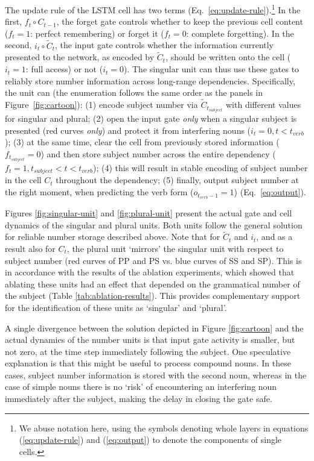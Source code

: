 The update rule of the LSTM cell has two terms
(Eq.~\ref{eq:update-rule}).\footnote{We abuse notation here, using the
  symbols denoting whole layers in equations (\ref{eq:update-rule}) and
  (\ref{eq:output}) to denote the components of single cells.} In the
first, $f_t \circ{} C_{t-1}$, the forget gate controls whether to keep
the previous cell content ($f_t=1$: perfect remembering) or forget it
($f_t=0$: complete forgetting). In the second,
$i_t\circ{} \tilde{C}_t$, the input gate controls whether the
information currently presented to the network, as encoded by
$\tilde{C}_t$, should be written onto the cell ($i_t=1$: full access)
or not ($i_t=0$). The singular unit can thus use these gates to
reliably store number information across long-range
dependencies. Specifically, the unit can (the enumeration follows the same order as the panels in Figure~\ref{fig:cartoon}): (1) encode subject
number via $\tilde{C}_{t_{subject}}$ with different values for
singular and plural; (2) open the input gate \textit{only} when a
singular subject is presented (red curves \textit{only}) and protect
it from interfering nouns ($i_t=0, t<t_{verb}$); (3) at the same time,
clear the cell from previously stored information
($f_{t_{subject}}=0$) and then store subject number across the entire
dependency ($f_t=1, t_{subject}<t<t_{verb}$); (4) this will result in
stable encoding of subject number in the cell $C_t$ throughout the
dependency; (5) finally, output subject number at the right moment,
when predicting the verb form ($o_{t_{verb}-1}=1$)
(Eq.~\ref{eq:output}).

Figures \ref{fig:singular-unit} and \ref{fig:plural-unit} present the actual gate and cell dynamics of the singular and plural units. Both units follow the general solution for reliable number storage described above. Note that for $\tilde{C}_t$ and $i_t$, and as a result also for $C_t$, the plural unit `mirrors' the singular unit with respect to subject number (red curves of PP and PS vs. blue curves of SS and SP). This is in accordance with the results of the ablation experiments, which showed that ablating these units had an effect that depended on the grammatical number of the subject (Table \ref{tab:ablation-results}). This provides complementary support for the identification of these units as `singular' and `plural'.

A single divergence between the solution depicted in Figure \ref{fig:cartoon} and the actual dynamics of the number units is that input gate activity is smaller, but not zero, at the time step immediately following the subject. One speculative explanation is that this might be useful to process compound nouns. In these cases, subject number information is stored with the second noun, whereas in the case of simple nouns there is no `risk' of encountering an interfering noun immediately after the subject, making the delay in closing the gate safe.

